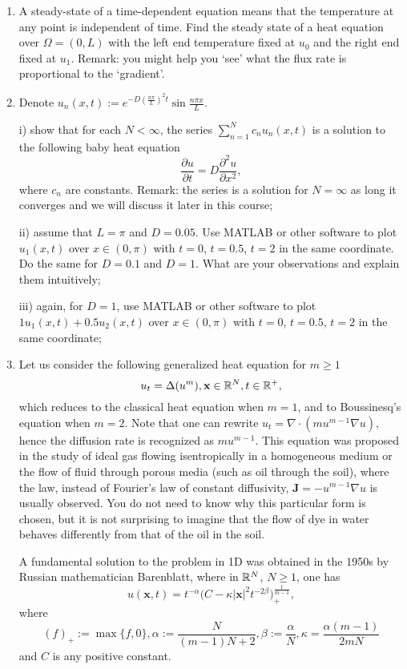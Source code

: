 \documentclass[6pt]{article}
\numberwithin{equation}{section}
\def\mathbb{\Bbb}
\begin{document}
\begin{enumerate}
\item A steady-state of a time-dependent equation means that the temperature at any point is independent of time.  Find the steady state of a heat equation over $\Omega=(0, L)$ with the left end temperature fixed at $u_0 $ and the right end fixed at $u_1$.   Remark: you might help you `see' what the flux rate is proportional to the `gradient'.

\item Denote $u_n(x,t):=e^{-D(\frac{n\pi}{L})^2t} \sin \frac{n\pi x}{L}$.

i) show that for each $N<\infty$, the series $\sum_{n=1}^N c_nu_n(x,t)$ is a solution to the following baby heat equation
\[\frac{\partial u}{\partial t}=D\frac{\partial^2 u}{\partial x^2},\]
where $c_n$ are constants.  Remark: the series is a solution for $N=\infty$ as long it converges and we will discuss it later in this course;

ii) assume that $L=\pi$ and $D=0.05$.  Use MATLAB or other software to plot $u_1(x,t)$ over $x\in(0,\pi)$ with $t=0$, $t=0.5$, $t=2$ in the same coordinate.  Do the same for $D=0.1$ and $D=1$.  What are your observations and explain them intuitively;

iii)  again, for $D=1$, use MATLAB or other software to plot $1u_1(x,t)+0.5u_2(x,t)$ over $x\in(0,\pi)$ with $t=0$, $t=0.5$, $t=2$ in the same coordinate;

\item  Let us consider the following generalized heat equation for $m\geq1$
\begin{equation}\label{PME}
u_t= \Delta (u^m),\textbf{x}\in\mathbb R^N, t\in\mathbb R^+,
\end{equation}
which reduces to the classical heat equation when $m=1$, and to Boussinesq's equation when $m=2$.  Note that one can rewrite $u_t=\nabla \cdot (mu^{m-1} \nabla u)$, hence the diffusion rate is recognized as $mu^{m-1}$.  This equation was proposed in the study of ideal gas flowing isentropically in a homogeneous medium or the flow of fluid through porous media (such as oil through the soil), where the law, instead of Fourier's law of constant diffusivity, $ \textbf{J}=- u^{m-1}\nabla u$ is usually observed.  You do not need to know why this particular form is chosen, but it is not surprising to imagine that the flow of dye in water behaves differently from that of the oil in the soil.

A fundamental solution to the problem in 1D was obtained in the 1950s by Russian mathematician Barenblatt, where in $\mathbb R^N$, $N\geq1$, one has
\begin{equation}\label{Barenblatt}
u(\textbf{x},t)=t^{-\alpha}\Big(C-\kappa |\textbf{x}|^2t^{-2\beta}\Big)_+^\frac{1}{m-1},
\end{equation}
where
\[(f)_+:=\max\{f,0\}, \alpha:=\frac{N}{(m-1)N+2}, \beta:=\frac{\alpha}{N}, \kappa =\frac{\alpha(m-1)}{2mN}\]
and $C$ is any positive constant.


\end{enumerate}
\end{document}
